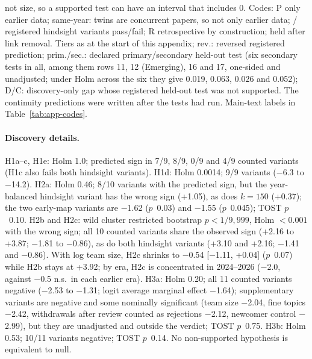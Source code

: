 \begin{table}[p]
{not size, so a supported test can have an interval that includes 0. Codes: P only earlier data; same-year: twins are
concurrent papers, so not only earlier data; \Hok/\Hno{} registered hindsight variants pass/fail; R retrospective by
construction; \Tok{} held after link removal. Tiers as at the start of this appendix; rev.: reversed registered
prediction; prim./sec.: declared primary/secondary held-out test (six secondary tests in all, among them rows 11, 12
(Emerging), 16 and 17, one-sided and unadjusted; under Holm across the six they give 0.019, 0.063, 0.026 and 0.052);
D/C: discovery-only gap whose registered held-out test was not supported. The continuity predictions were written
after the tests had run. Main-text labels in Table~\ref{tab:app-codes}.}
\label{tab:app-main}
\end{table}

\paragraph{Discovery details.} H1a--c, H1e: Holm 1.0; predicted sign in 7/9, 8/9, 0/9 and 4/9 counted variants
(H1c also fails both hindsight variants). H1d: Holm 0.0014; 9/9 variants ($-$6.3 to $-$14.2). H2a: Holm 0.46; 8/10
variants with the predicted sign, but the year-balanced hindsight variant has the wrong sign (+1.05), as does $k=150$
(+0.37); the two early-map variants are $-$1.62 ($p$~0.03) and $-$1.55 ($p$~0.045); TOST $p$~0.10. H2b and H2c: wild
cluster restricted bootstrap $p < 1/9{,}999$, Holm $<0.001$ with the wrong sign; all 10 counted variants share the
observed sign (+2.16 to +3.87; $-$1.81 to $-$0.86), as do both hindsight variants (+3.10 and +2.16; $-$1.41 and
$-$0.86). With log team size, H2c shrinks to $-$0.54 [$-$1.11, +0.04] ($p$~0.07) while H2b stays at +3.92; by era,
H2c is concentrated in 2024--2026 ($-$2.0, against $-$0.5 n.s.\ in each earlier era). H3a: Holm 0.20; all 11
counted variants negative ($-$2.53 to $-$1.31; logit average marginal effect $-$1.64); supplementary variants are
negative and some nominally significant (team size $-$2.04, fine topics $-$2.42, withdrawals after review counted as
rejections $-$2.12, newcomer control $-$2.99), but they are unadjusted and outside the verdict; TOST $p$~0.75. H3b:
Holm 0.53; 10/11 variants negative; TOST $p$~0.14. No non-supported hypothesis is equivalent to null.

